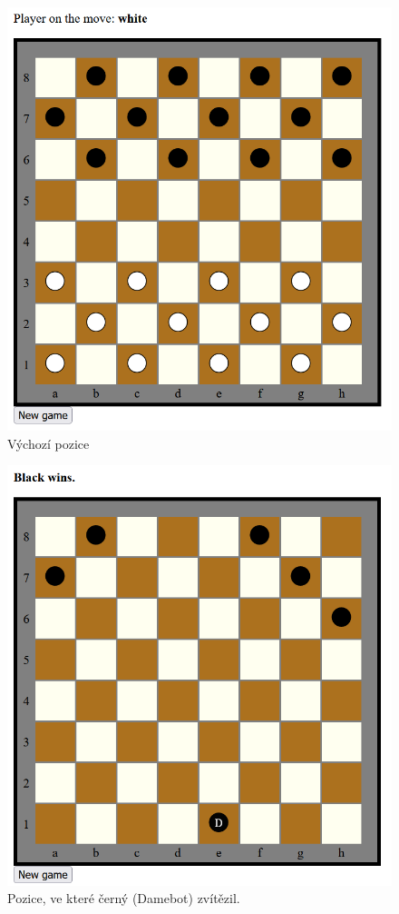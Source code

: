 \documentclass[a4paper,12pt]{article}
\begin{document}
	\begin{figure}[h]
		\centering
		\includegraphics{img/vychozi_pozice}
		\caption{Výchozí pozice}
	\end{figure}

	\begin{figure}[h]
		\centering
		\includegraphics{img/bot_vyhral}
		\caption{Pozice, ve které černý (Damebot) zvítězil.}
	\end{figure}
\end{document}
